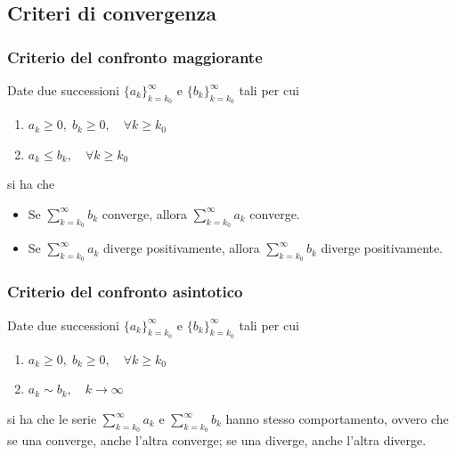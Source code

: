 \documentclass{article}
\begin{document}
        \vspace{10pt}
        \subsection{Criteri di convergenza}
            \subsubsection{Criterio del confronto maggiorante}
                Date due successioni $\{a_{k}\}_{k = k_{0}}^{\infty}$ e $\{b_{k}\}_{k = k_{0}}^{\infty}$ tali per cui
                \begin{enumerate}[label=(\arabic*)]
                    \item $a_{k} \geq 0, \; b_{k} \geq 0, \quad \forall k \geq k_{0}$
                    \item $a_{k} \leq b_{k}, \quad \forall k \geq k_{0}$
                \end{enumerate}
                si ha che
                \begin{itemize}
                    \item Se $\sum_{k = k_{0}}^{\infty} b_{k}$ converge, allora $\sum_{k = k_{0}}^{\infty} a_{k}$ converge.
                    \item Se $\sum_{k = k_{0}}^{\infty} a_{k}$ diverge positivamente, allora $\sum_{k = k_{0}}^{\infty} b_{k}$ diverge positivamente.
                \end{itemize}
            
            \vspace{10pt}
            \subsubsection{Criterio del confronto asintotico}
                Date due successioni $\{a_{k}\}_{k = k_{0}}^{\infty}$ e $\{b_{k}\}_{k = k_{0}}^{\infty}$ tali per cui
                \begin{enumerate}[label=(\arabic*)]
                    \item $a_{k} \geq 0, \; b_{k} \geq 0, \quad \forall k \geq k_{0}$
                    \item $a_{k} \sim b_{k}, \quad k \rightarrow \infty$
                \end{enumerate}
                si ha che le serie $\sum_{k = k_{0}}^{\infty} a_{k}$ e $\sum_{k = k_{0}}^{\infty} b_{k}$ hanno stesso comportamento, ovvero che se una converge, anche l'altra converge; se una diverge, anche l'altra diverge.
        
\end{document}
